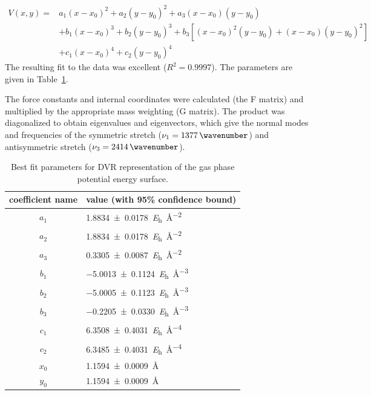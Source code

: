 \documentclass[%
  class = book,%
  crop = false,%
  float = true,%
  multi = true,%
  preview = false,%
]{standalone}
\begin{document}
\begin{equation*}
  \begin{split}
    V( x,y ) = & a_{1}( x - x_{0} )^{2} + a_{2}( y - y_{0} )^{2} + a_{3}( x - x_{0} )( y - y_{0} ) \\
    & + b_{1}( x - x_{0} )^{3} + b_{2}( y - y_{0} )^{3} + b_{3}[ ( x - x_{0} )^{2}( y - y_{0} ) + ( x - x_{0} )( y - y_{0} )^{2} ] \\
    & + c_{1}( x - x_{0} )^{4} + c_{2}( y - y_{0} )^{4}
  \end{split}
\end{equation*}
The resulting fit to the data was excellent (\(R^2 = 0.9997\)). The parameters are given in Table~\ref{paper_02:tab:S5}.

The force constants and internal coordinates were calculated (the F matrix) and multiplied by the appropriate mass weighting (G matrix). The product was diagonalized to obtain eigenvalues and eigenvectors, which give the normal modes and frequencies of the symmetric stretch (\(\nu_{1} = \SI{1377}{\wavenumber}\)) and antisymmetric stretch (\(\nu_{3} = \SI{2414}{\wavenumber}\)).

\begin{table}
  \centering
  \caption[Fit parameters for DVR PES]{Best fit parameters for DVR representation of the gas phase  potential energy surface.}
  \label{paper_02:tab:S5}
  \begin{tabular}{cl}
    \toprule
    coefficient name & value (with 95\% confidence bound) \\
    \midrule
    \(a_1\) & \SI{1.8834 \pm 0.0178}{\hartree\per\angstrom\squared} \\
    \(a_2\) & \SI{1.8834 \pm 0.0178}{\hartree\per\angstrom\squared} \\
    \(a_3\) & \SI{0.3305 \pm 0.0087}{\hartree\per\angstrom\squared} \\
    \(b_1\) & \SI{-5.0013 \pm 0.1124}{\hartree\per\angstrom\cubed} \\
    \(b_2\) & \SI{-5.0005 \pm 0.1123}{\hartree\per\angstrom\cubed} \\
    \(b_3\) & \SI{-0.2205 \pm 0.0330}{\hartree\per\angstrom\cubed} \\
    \(c_1\) & \SI{6.3508 \pm 0.4031}{\hartree\per\angstrom\tothe{4}} \\
    \(c_2\) & \SI{6.3485 \pm 0.4031}{\hartree\per\angstrom\tothe{4}} \\
    \(x_0\) & \SI{1.1594 \pm 0.0009}{\angstrom} \\
    \(y_0\) & \SI{1.1594 \pm 0.0009}{\angstrom} \\
    \bottomrule
  \end{tabular}
\end{table}
\end{document}
